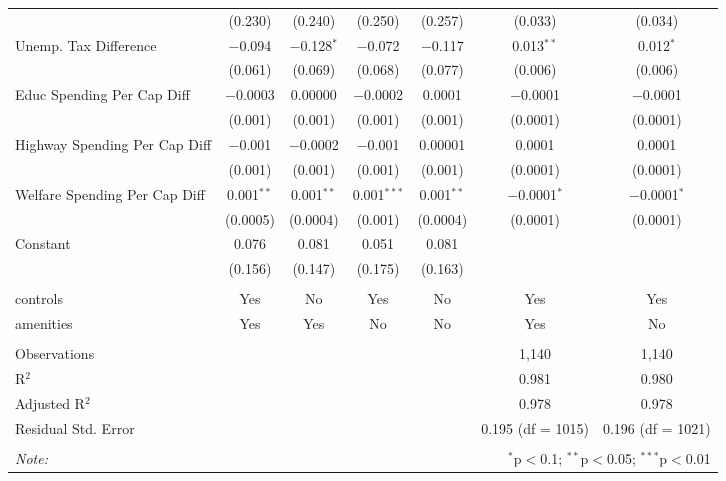 \begin{table}[!htbp]
\begin{tabular}{@{\extracolsep{5pt}}lcccccc}
  & (0.230) & (0.240) & (0.250) & (0.257) & (0.033) & (0.034) \\ 
  Unemp. Tax Difference & $-$0.094 & $-$0.128$^{*}$ & $-$0.072 & $-$0.117 & 0.013$^{**}$ & 0.012$^{*}$ \\ 
  & (0.061) & (0.069) & (0.068) & (0.077) & (0.006) & (0.006) \\ 
  Educ Spending Per Cap Diff & $-$0.0003 & 0.00000 & $-$0.0002 & 0.0001 & $-$0.0001 & $-$0.0001 \\ 
  & (0.001) & (0.001) & (0.001) & (0.001) & (0.0001) & (0.0001) \\ 
  Highway Spending Per Cap Diff & $-$0.001 & $-$0.0002 & $-$0.001 & 0.00001 & 0.0001 & 0.0001 \\ 
  & (0.001) & (0.001) & (0.001) & (0.001) & (0.0001) & (0.0001) \\ 
  Welfare Spending Per Cap Diff & 0.001$^{**}$ & 0.001$^{**}$ & 0.001$^{***}$ & 0.001$^{**}$ & $-$0.0001$^{*}$ & $-$0.0001$^{*}$ \\ 
  & (0.0005) & (0.0004) & (0.001) & (0.0004) & (0.0001) & (0.0001) \\ 
  Constant & 0.076 & 0.081 & 0.051 & 0.081 &  &  \\ 
  & (0.156) & (0.147) & (0.175) & (0.163) &  &  \\ 
 \hline \\[-1.8ex] 
controls & Yes & No & Yes & No & Yes & Yes \\ 
amenities & Yes & Yes & No & No & Yes & No \\ 
\hline \\[-1.8ex] 
Observations &  &  &  &  & 1,140 & 1,140 \\ 
R$^{2}$ &  &  &  &  & 0.981 & 0.980 \\ 
Adjusted R$^{2}$ &  &  &  &  & 0.978 & 0.978 \\ 
Residual Std. Error &  &  &  &  & 0.195 (df = 1015) & 0.196 (df = 1021) \\ 
\hline 
\hline \\[-1.8ex] 
\textit{Note:}  & \multicolumn{6}{r}{$^{*}$p$<$0.1; $^{**}$p$<$0.05; $^{***}$p$<$0.01} \\ 
\end{tabular} 
\end{table} 
